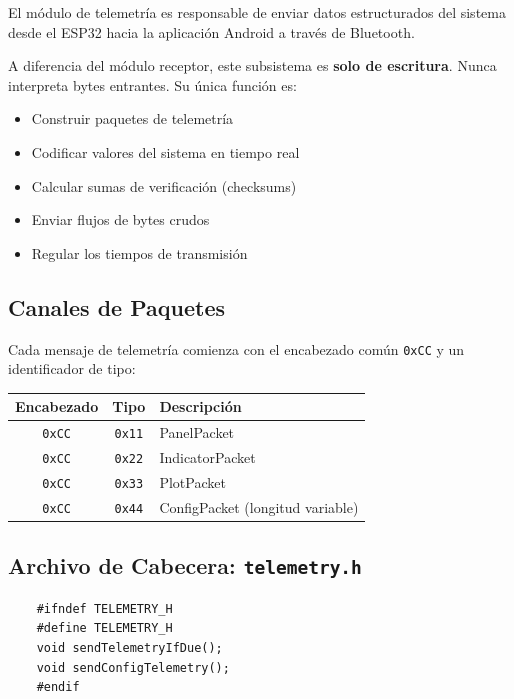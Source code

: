 \documentclass[12pt,a4paper]{article}
\newcommand{\ardfnDG}[1]{\texttt{\textcolor{arduinoTeal}{#1}}}
\begin{document}
El módulo de telemetría es responsable de enviar datos estructurados del sistema
desde el ESP32 hacia la aplicación Android a través de Bluetooth.

A diferencia del módulo receptor, este subsistema es \textbf{solo de escritura}.
Nunca interpreta bytes entrantes. Su única función es:

\begin{itemize}
	\item Construir paquetes de telemetría
	\item Codificar valores del sistema en tiempo real
	\item Calcular sumas de verificación (checksums)
	\item Enviar flujos de bytes crudos
	\item Regular los tiempos de transmisión
\end{itemize}

\subsection{Canales de Paquetes}

Cada mensaje de telemetría comienza con el encabezado común \texttt{0xCC}
y un identificador de tipo:

\begin{center}
	\renewcommand{\arraystretch}{1.4}
	\setlength{\tabcolsep}{14pt}
	
	\begin{tabular}{@{} c c l @{}}
		\rowcolor{arduinoGreen!25}
		\textbf{Encabezado} & \textbf{Tipo} & \textbf{Descripción} \\ \midrule
		\texttt{0xCC} & \texttt{0x11} & PanelPacket \\
		\texttt{0xCC} & \texttt{0x22} & IndicatorPacket \\
		\texttt{0xCC} & \texttt{0x33} & PlotPacket \\
		\texttt{0xCC} & \texttt{0x44} & ConfigPacket (longitud variable) \\
	\end{tabular}
\end{center}

\subsection{Archivo de Cabecera: \ardfnDG{telemetry.h}}

\begin{lstlisting}
	#ifndef TELEMETRY_H
	#define TELEMETRY_H
	void sendTelemetryIfDue();
	void sendConfigTelemetry();
	#endif
\end{lstlisting}
\end{document}
